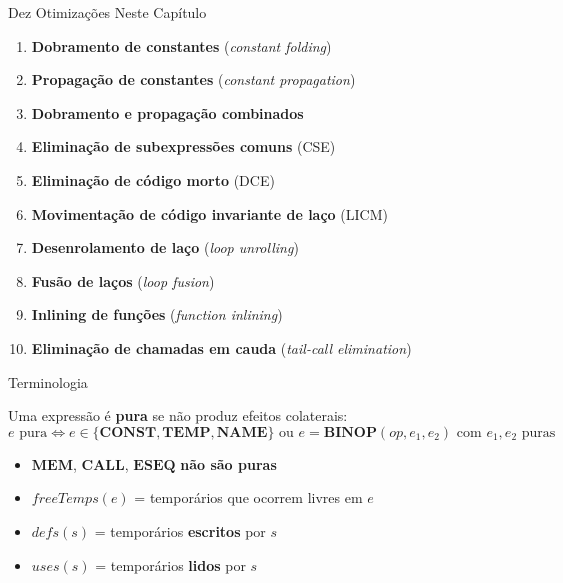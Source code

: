 \begin{frame}{Dez Otimizações Neste Capítulo}

    \begin{enumerate}

        \item
        \textbf{Dobramento de constantes} (\emph{constant folding})
        \item
        \textbf{Propagação de constantes} (\emph{constant propagation})
        \item
        \textbf{Dobramento e propagação combinados}
        \item
        \textbf{Eliminação de subexpressões comuns} (CSE)
        \item
        \textbf{Eliminação de código morto} (DCE)
        \item
        \textbf{Movimentação de código invariante de laço} (LICM)
        \item
        \textbf{Desenrolamento de laço} (\emph{loop unrolling})
        \item
        \textbf{Fusão de laços} (\emph{loop fusion})
        \item
        \textbf{Inlining de funções} (\emph{function inlining})
        \item
        \textbf{Eliminação de chamadas em cauda} (\emph{tail-call
        elimination})
    \end{enumerate}
\end{frame}

\begin{frame}{Terminologia}

    Uma expressão é \textbf{pura} se não produz efeitos colaterais:
    \[e \text{ pura} \iff e \in \{\mathbf{CONST}, \mathbf{TEMP}, \mathbf{NAME}\} \text{ ou } e = \mathbf{BINOP}(\mathit{op}, e_1, e_2) \text{ com } e_1, e_2 \text{ puras}\]

    \begin{itemize}

        \item
        \(\mathbf{MEM}\), \(\mathbf{CALL}\), \(\mathbf{ESEQ}\) \textbf{não são
        puras}
        \item
        \(\mathit{freeTemps}(e)\) = temporários que ocorrem livres em \(e\)
        \item
        \(\mathit{defs}(s)\) = temporários \textbf{escritos} por \(s\)
        \item
        \(\mathit{uses}(s)\) = temporários \textbf{lidos} por \(s\)
    \end{itemize}
\end{frame}



